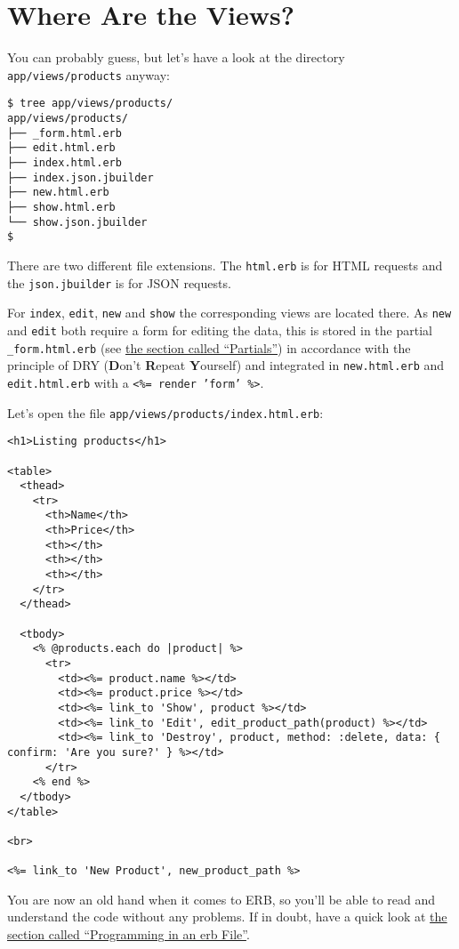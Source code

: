 \documentclass[a4paper]{book}
\newcounter{tab}[chapter]
\newcommand{\chap}[1]{\newpage\thispagestyle{empty}\chapter{#1}\label{chap:\thechapter}}
\begin{document}
\chap{Where Are the Views?}\label{where-are-the-views}

You can probably guess, but let's have a look at the directory \texttt{app/views/products} anyway:

\begin{shaded}\begin{verbatim}
$ tree app/views/products/
app/views/products/
├── _form.html.erb
├── edit.html.erb
├── index.html.erb
├── index.json.jbuilder
├── new.html.erb
├── show.html.erb
└── show.json.jbuilder
$
\end{verbatim}\end{shaded}

There are two different file extensions. The \texttt{html.erb} is for HTML requests and the \texttt{json.jbuilder} is for JSON requests.

For \texttt{index}, \texttt{edit}, \texttt{new} and \texttt{show} the corresponding views are located there. As \texttt{new} and \texttt{edit} both require a form for editing the data, this is stored in the partial \texttt{\_form.html.erb} (see \hyperref[partials]{the section called “Partials”}) in accordance with the principle of DRY (\textbf{D}on't \textbf{R}epeat \textbf{Y}ourself) and integrated in \texttt{new.html.erb} and \texttt{edit.html.erb} with a \texttt{\textless{}\%= render 'form'         \%\textgreater{}}.

Let's open the file \texttt{app/views/products/index.html.erb}:

\begin{shaded}\begin{verbatim}
<h1>Listing products</h1>

<table>
  <thead>
    <tr>
      <th>Name</th>
      <th>Price</th>
      <th></th>
      <th></th>
      <th></th>
    </tr>
  </thead>

  <tbody>
    <% @products.each do |product| %>
      <tr>
        <td><%= product.name %></td>
        <td><%= product.price %></td>
        <td><%= link_to 'Show', product %></td>
        <td><%= link_to 'Edit', edit_product_path(product) %></td>
        <td><%= link_to 'Destroy', product, method: :delete, data: { confirm: 'Are you sure?' } %></td>
      </tr>
    <% end %>
  </tbody>
</table>

<br>

<%= link_to 'New Product', new_product_path %>
\end{verbatim}\end{shaded}

You are now an old hand when it comes to ERB, so you'll be able to read and understand the code without any problems. If in doubt, have a quick look at \hyperref[erb-programmieren]{the section called “Programming in an erb File”}.
\end{document}
